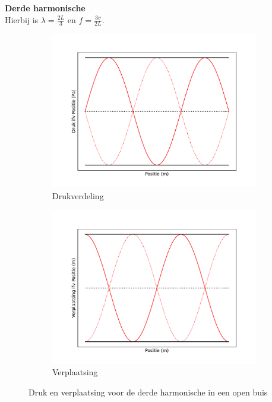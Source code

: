 \documentclass[a4paper,kul]{kulakarticle} %
\begin{document}
\textbf{Derde harmonische}\\
Hierbij is $\lambda = \frac{2L}{3}$ en $f=\frac{3v}{2L}$.

\begin{figure}[!h]
	\centering
	\begin{subfigure}{.5\textwidth}
		\centering
		\includegraphics[width=1\linewidth]{OpenBuisDerdeDruk}
		\caption{Drukverdeling}
		\label{fig:DerdeBuisDruk}
	\end{subfigure}%
	\begin{subfigure}{.5\textwidth}
		\centering
		\includegraphics[width=1\linewidth]{OpenBuisDerdeVerplaatsing}
		\caption{Verplaatsing}
		\label{fig:DerdeBuisVerplaatsing}
	\end{subfigure}
	\caption{Druk en verplaatsing voor de derde harmonische in een open buis}
	\label{fig:OpenBuisDerde}
\end{figure}
\newpage
\end{document}

